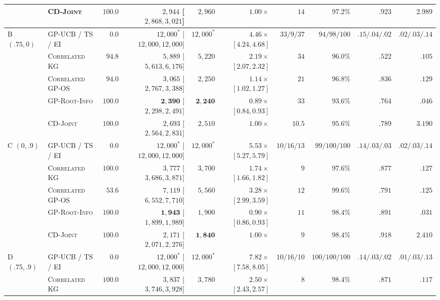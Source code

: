 \documentclass{article}
\theoremstyle{plain}
\theoremstyle{definition}
\begin{document}
\begin{table}[!htbp]
{\begin{tabular}{@{}llrrrrrrrr@{}}
 & \textsc{CD-Joint} & $\mathbf{100.0}$ & $2{,}944$ [$2{,}868,3{,}021$] & $2{,}960$ & $1.00\times$ & $14$ & $97.2\%$ & $.923$ & $2.989$ \\
\midrule
\multirow{5}{*}{B $(.75,0)$}
 & \textsc{GP-UCB} / \textsc{TS} / \textsc{EI} & $0.0$ & $12{,}000^*$ [$12{,}000,12{,}000$] & $12{,}000^*$ & $4.46\times$ $[4.24,4.68]$ & $33/9/37$ & $94/98/100$ & $.15/.04/.02$ & $.02/.03/.14$ \\
 & \textsc{Correlated KG} & $94.8$ & $5{,}889$ [$5{,}613,6{,}176$] & $5{,}220$ & $2.19\times$ $[2.07,2.32]$ & $34$ & $96.0\%$ & $.522$ & $.105$ \\
 & \textsc{Correlated GP-OS} & $94.0$ & $3{,}065$ [$2{,}767,3{,}388$] & $2{,}250$ & $1.14\times$ $[1.02,1.27]$ & $21$ & $96.8\%$ & $.836$ & $.129$ \\
 & \textsc{GP-Root-Info} & $\mathbf{100.0}$ & $\mathbf{2{,}390}$ [$2{,}298,2{,}491$] & $\mathbf{2{,}240}$ & $0.89\times$ $[0.84,0.93]$ & $33$ & $93.6\%$ & $.764$ & $.046$ \\
 & \textsc{CD-Joint} & $\mathbf{100.0}$ & $2{,}693$ [$2{,}564,2{,}831$] & $2{,}510$ & $1.00\times$ & $10.5$ & $95.6\%$ & $.789$ & $3.190$ \\
\midrule
\multirow{5}{*}{C $(0,.9)$}
 & \textsc{GP-UCB} / \textsc{TS} / \textsc{EI} & $0.0$ & $12{,}000^*$ [$12{,}000,12{,}000$] & $12{,}000^*$ & $5.53\times$ $[5.27,5.79]$ & $10/16/13$ & $99/100/100$ & $.14/.03/.03$ & $.02/.03/.14$ \\
 & \textsc{Correlated KG} & $\mathbf{100.0}$ & $3{,}777$ [$3{,}686,3{,}871$] & $3{,}700$ & $1.74\times$ $[1.66,1.82]$ & $9$ & $97.6\%$ & $.877$ & $.127$ \\
 & \textsc{Correlated GP-OS} & $53.6$ & $7{,}119$ [$6{,}552,7{,}710$] & $5{,}560$ & $3.28\times$ $[2.99,3.59]$ & $12$ & $99.6\%$ & $.791$ & $.125$ \\
 & \textsc{GP-Root-Info} & $\mathbf{100.0}$ & $\mathbf{1{,}943}$ [$1{,}899,1{,}989$] & $1{,}900$ & $0.90\times$ $[0.86,0.93]$ & $11$ & $98.4\%$ & $.891$ & $.031$ \\
 & \textsc{CD-Joint} & $\mathbf{100.0}$ & $2{,}171$ [$2{,}071,2{,}276$] & $\mathbf{1{,}840}$ & $1.00\times$ & $9$ & $98.4\%$ & $.918$ & $2.410$ \\
\midrule
\multirow{5}{*}{D $(.75,.9)$}
 & \textsc{GP-UCB} / \textsc{TS} / \textsc{EI} & $0.0$ & $12{,}000^*$ [$12{,}000,12{,}000$] & $12{,}000^*$ & $7.82\times$ $[7.58,8.05]$ & $10/16/10$ & $100/100/100$ & $.14/.03/.02$ & $.01/.03/.13$ \\
 & \textsc{Correlated KG} & $\mathbf{100.0}$ & $3{,}837$ [$3{,}746,3{,}928$] & $3{,}780$ & $2.50\times$ $[2.43,2.57]$ & $8$ & $98.4\%$ & $.871$ & $.117$ \\

\end{tabular}}
\end{table}
\end{document}
